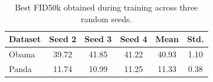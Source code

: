 \begin{table}[t]
\centering
\caption{Best FID50k obtained during training across three random seeds.}
\label{tab:baseline_best_fid}
\begin{tabular}{lccccc}
\hline
Dataset & Seed 2 & Seed 3 & Seed 4 & Mean & Std. \\
\hline
Obama & 39.72 & 41.85 & 41.22 & 40.93 & 1.10 \\
Panda & 11.74 & 10.99 & 11.25 & 11.33 & 0.38 \\
\hline
\end{tabular}
\end{table}
